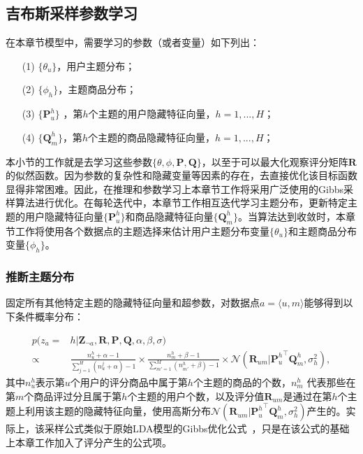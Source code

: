 \subsection{吉布斯采样参数学习}
\label{subsec-bpmtmf-gibbs}
在本章节模型中，需要学习的参数（或者变量）如下列出：
\begin{itemize}
	\item[(1)] $\{\theta_u\}$，用户主题分布；
	\item[(2)] $\{\phi_h\}$，主题商品分布；
	\item[(3)] $\{\mathbf{P}_u^{h}\}$ ，第$h$个主题的用户隐藏特征向量，$h=1,...,H$；
	\item[(4)] $\{\mathbf{Q}_m^{h}\}$，第$h$个主题的商品隐藏特征向量，$h=1,...,H$；
\end{itemize}

本小节的工作就是去学习这些参数$\{\theta,\phi, \mathbf{P}, \mathbf{Q}\}$，以至于可以最大化观察评分矩阵$\mathbf{R}$的似然函数。因为参数的复杂性和隐藏变量等因素的存在，去直接优化该目标函数显得非常困难。因此，在推理和参数学习上本章节工作将采用广泛使用的Gibbs采样算法进行优化。在每轮迭代中，本章节工作相互迭代学习主题分布，更新特定主题的用户隐藏特征向量$\{\mathbf{P}_u^{h}\}$和商品隐藏特征向量$\{\mathbf{Q}_m^{h}\}$。当算法达到收敛时，本章节工作将使用各个数据点的主题选择来估计用户主题分布变量$\{\theta_u\}$和主题商品分布变量$\{\phi_h\}$。

\subsubsection{推断主题分布}
固定所有其他特定主题的隐藏特征向量和超参数，对数据点$a=\langle u,m\rangle$能够得到以下条件概率分布：

\begin{align}
	\label{eq-bpmtmf-topic}
	p(z_a=&h|\mathbf{Z}_{\neg a},\mathbf{R},\mathbf{P},\mathbf{Q},\alpha,\beta,\sigma)  \\\nonumber
	\propto&\frac{n_{u}^h+\alpha-1}{\sum_{j=1}^H (n_{u}^j+\alpha)-1}\times\frac{n_{m}^h+\beta-1}{\sum_{m'=1}^{M}(n_{m'}^{h}+\beta)-1}\times\mathcal{N}(\mathbf{R}_{um}|{\mathbf{P}_{u}^{h}}^{\top}\mathbf{Q}_{m}^{h},\sigma_h^2),\nonumber
\end{align}
其中$n_{u}^h$表示第$u$个用户的评分商品中属于第$h$个主题的商品的个数，$n_{m}^h$ 代表那些在第$m$个商品评过分且属于第$h$个主题的用户个数，以及评分值$\mathbf{R}_{um}$是通过在第$h$个主题上利用该主题的隐藏特征向量，使用高斯分布$\mathcal{N}(\mathbf{R}_{um}|{\mathbf{P}_{u}^{h}}^{\top}\mathbf{Q}_{m}^{h},\sigma_h^2)$产生的。实际上，该采样公式类似于原始LDA模型的Gibbs优化公式~\cite{heinrich2005parameter}，只是在该公式的基础上本章工作加入了评分产生的公式项。

